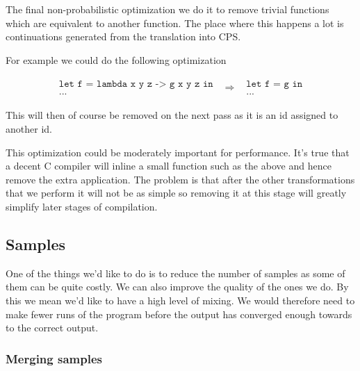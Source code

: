 \documentclass[a4paper]{article}
\newcommand{\optimization}[2]{
	\[
		\begin{array}{rcl}
			#1 & \Rightarrow & #2
		\end{array}
	\]
}
\begin{document}
The final non-probabilistic optimization we do it to remove trivial functions which are equivalent to another function. The place where this happens a lot is continuations generated from the translation into CPS.

For example we could do the following optimization
\optimization{
	\begin{array}{l}
		\texttt{let f = lambda x y z -> g x y z in} \\
		\texttt{...}
	\end{array}
}{
	\begin{array}{l}
		\texttt{let f = g in} \\
		\texttt{...}
	\end{array}
}
This will then of course be removed on the next pass as it is an id assigned to another id.

This optimization could be moderately important for performance. It's true that a decent C compiler will inline a small function such as the above and hence remove the extra application. The problem is that after the other transformations that we perform it will not be as simple so removing it at this stage will greatly simplify later stages of compilation.




\subsection{Samples}

One of the things we'd like to do is to reduce the number of samples as some of them can be quite costly. We can also improve the quality of the ones we do. By this we mean we'd like to have a high level of mixing. We would therefore need to make fewer runs of the program before the output has converged enough towards to the correct output.




\subsubsection{Merging samples}
\end{document}
